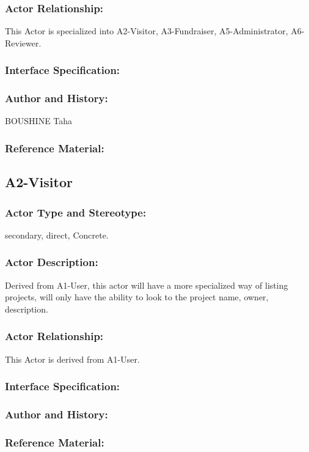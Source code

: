 \documentclass[11pt, openany]{report}
\begin{document}
\subsubsection{Actor Relationship:}
This Actor is specialized into A2-Visitor, A3-Fundraiser, A5-Administrator, A6-Reviewer.

\subsubsection{Interface Specification:}
\subsubsection{Author and History:}
BOUSHINE Taha
\subsubsection{Reference Material:}
\clearpage


\subsection{A2-Visitor}
\label{A2}
\subsubsection{Actor Type and Stereotype:}
secondary, direct, Concrete.
\subsubsection{Actor Description:}
Derived from A1-User, this actor will have a more specialized way of listing projects, will only have the ability to look to the project name, owner, description.
\subsubsection{Actor Relationship:}
This Actor is derived from A1-User.
\subsubsection{Interface Specification:}
\subsubsection{Author and History:}
\subsubsection{Reference Material:}
\end{document}
